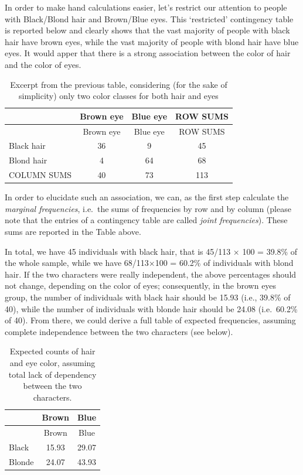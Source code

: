 \documentclass[
  letterpaper,
  DIV=11,
  numbers=noendperiod]{scrreprt}
\begin{document}
In order to make hand calculations easier, let's restrict our attention
to people with Black/Blond hair and Brown/Blue eyes. This `restricted'
contingency table is reported below and clearly shows that the vast
majority of people with black hair have brown eyes, while the vast
majority of people with blond hair have blue eyes. It would apper that
there is a strong association between the color of hair and the color of
eyes.

\begin{longtable}[]{@{}lccc@{}}
\caption{Excerpt from the previous table, considering (for the sake of
simplicity) only two color classes for both hair and
eyes}\tabularnewline
\toprule\noalign{}
& Brown eye & Blue eye & ROW SUMS \\
\midrule\noalign{}
\endfirsthead
\toprule\noalign{}
& Brown eye & Blue eye & ROW SUMS \\
\midrule\noalign{}
\endhead
\bottomrule\noalign{}
\endlastfoot
Black hair & 36 & 9 & 45 \\
Blond hair & 4 & 64 & 68 \\
COLUMN SUMS & 40 & 73 & 113 \\
\end{longtable}

In order to elucidate such an association, we can, as the first step
calculate the \emph{marginal frequencies}, i.e.~the sums of frequencies
by row and by column (please note that the entries of a contingency
table are called \emph{joint frequencies}). These sums are reported in
the Table above.

In total, we have 45 individuals with black hair, that is 45/113 × 100 =
39.8\% of the whole sample, while we have 68/113×100 = 60.2\% of
individuals with blond hair. If the two characters were really
independent, the above percentages should not change, depending on the
color of eyes; consequently, in the brown eyes group, the number of
individuals with black hair should be 15.93 (i.e., 39.8\% of 40), while
the number of individuals with blonde hair should be 24.08 (i.e.~60.2\%
of 40). From there, we could derive a full table of expected
frequencies, assuming complete independence between the two characters
(see below).

\begin{longtable}[]{@{}lcc@{}}
\caption{Expected counts of hair and eye color, assuming total lack of
dependency between the two characters.}\tabularnewline
\toprule\noalign{}
& Brown & Blue \\
\midrule\noalign{}
\endfirsthead
\toprule\noalign{}
& Brown & Blue \\
\midrule\noalign{}
\endhead
\bottomrule\noalign{}
\endlastfoot
Black & 15.93 & 29.07 \\
Blonde & 24.07 & 43.93 \\
\end{longtable}
\end{document}
